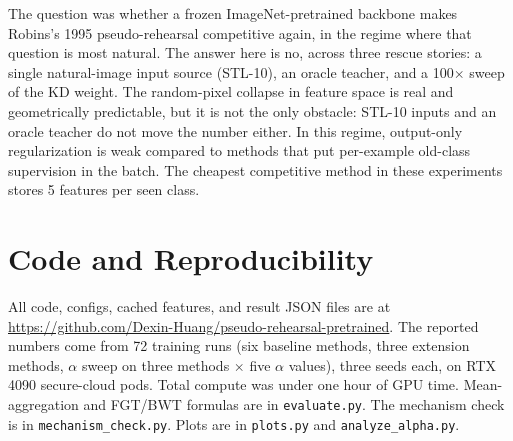 \documentclass[conference]{IEEEtran}
\begin{document}
The question was whether a frozen ImageNet-pretrained backbone makes
Robins's 1995 pseudo-rehearsal competitive again, in the regime where
that question is most natural. The answer here is no, across three
rescue stories: a single natural-image input source (STL-10), an oracle
teacher, and a 100$\times$ sweep of the KD weight. The random-pixel
collapse in feature space is real and geometrically predictable, but it
is not the only obstacle: STL-10 inputs and an oracle teacher do not
move the number either. In this regime, output-only regularization is
weak compared to methods that put per-example old-class supervision in
the batch. The cheapest competitive method in these experiments stores 5
features per seen class.

\section*{Code and Reproducibility}

All code, configs, cached features, and result JSON files are at
\url{https://github.com/Dexin-Huang/pseudo-rehearsal-pretrained}. The
reported numbers come from 72 training runs (six baseline methods, three
extension methods, $\alpha$ sweep on three methods $\times$ five
$\alpha$ values), three seeds each, on RTX 4090 secure-cloud pods. Total
compute was under one hour of GPU time. Mean-aggregation and FGT/BWT
formulas are in \texttt{evaluate.py}. The mechanism check is in
\texttt{mechanism\_check.py}. Plots are in \texttt{plots.py} and
\texttt{analyze\_alpha.py}.

\clearpage



\end{document}
